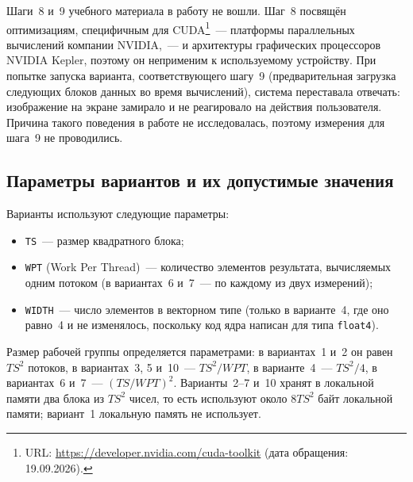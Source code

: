 \documentclass[a4paper]{article}
\begin{document}
Шаги~8 и~9 учебного материала в работу не вошли. Шаг~8 посвящён
оптимизациям, специфичным для CUDA\footnote{URL: \url{https://developer.nvidia.com/cuda-toolkit}
(дата обращения: 19.09.2026).}~--- платформы параллельных вычислений
компании NVIDIA,~--- и архитектуры графических процессоров NVIDIA
Kepler, поэтому он неприменим к используемому устройству. При попытке
запуска варианта, соответствующего шагу~9 (предварительная загрузка
следующих блоков данных во время вычислений), система переставала
отвечать: изображение на экране замирало и не реагировало на действия
пользователя. Причина такого поведения в работе не исследовалась,
поэтому измерения для шага~9 не проводились.

\subsection{Параметры вариантов и их допустимые значения}
\label{sec:params}

Варианты используют следующие параметры:
\begin{itemize}
    \item \texttt{TS}~--- размер квадратного блока;
    \item \texttt{WPT} (Work Per Thread)~--- количество элементов
    результата, вычисляемых одним потоком (в вариантах~6 и~7~---
    по каждому из двух измерений);
    \item \texttt{WIDTH}~--- число элементов в векторном типе
    (только в варианте~4, где оно равно~4 и не изменялось, поскольку
    код ядра написан для типа \texttt{float4}).
\end{itemize}

Размер рабочей группы определяется параметрами: в вариантах~1 и~2 он
равен $TS^2$ потоков, в вариантах~3, 5 и~10~--- $TS^2/WPT$,
в варианте~4~--- $TS^2/4$, в вариантах~6 и~7~--- $(TS/WPT)^2$.
Варианты~2--7 и~10 хранят в локальной памяти два блока из $TS^2$ чисел,
то есть используют около $8 TS^2$ байт локальной памяти; вариант~1
локальную память не использует.
\end{document}
